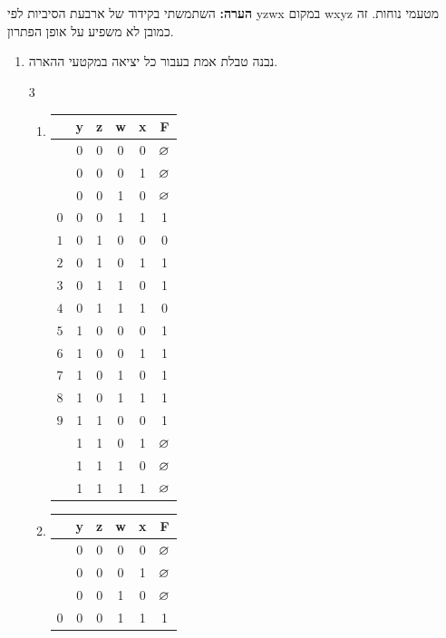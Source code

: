 \documentclass[]{../../../../tex/classes/homework}
\newcommand\DC{$\vn$}
\begin{document}
	\section{}
	\textbf{הערה: }השתמשתי בקידוד של ארבעת הסיביות לפי {yzwx} במקום {wxyz} מטעמי נוחות. זה כמובן לא משפיע על אופן הפתרון. 
	\begin{enumerate}
		\item נבנה טבלת אמת בעבור כל יציאה במקטעי ההארה. 
		\begin{multicols}{3}
			\begin{enumerate}
				\item \begin{center}
					\begin{tabular}{ c c c c c|c }
						\en{No.} & y & z & w & x & F \\
						\hline
						   & 0 & 0 & 0 & 0 & \DC \\ 
						   & 0 & 0 & 0 & 1 & \DC \\ 
						   & 0 & 0 & 1 & 0 & \DC \\ 
						$0$& 0 & 0 & 1 & 1 & 1 \\ 
						$1$& 0 & 1 & 0 & 0 & 0 \\ 
						$2$& 0 & 1 & 0 & 1 & 1 \\ 
						$3$& 0 & 1 & 1 & 0 & 1 \\ 
						$4$& 0 & 1 & 1 & 1 & 0 \\ 
						$5$& 1 & 0 & 0 & 0 & 1 \\ 
						$6$& 1 & 0 & 0 & 1 & 1 \\ 
						$7$& 1 & 0 & 1 & 0 & 1 \\ 
						$8$& 1 & 0 & 1 & 1 & 1 \\
						$9$& 1 & 1 & 0 & 0 & 1 \\ 
						   & 1 & 1 & 0 & 1 & \DC \\ 
						   & 1 & 1 & 1 & 0 & \DC \\ 
						   & 1 & 1 & 1 & 1 & \DC
					\end{tabular}
				\end{center}
				\item \begin{center}
					\begin{tabular}{ c c c c c|c }
						\en{No.} & y & z & w & x & F \\
						\hline
						   & 0 & 0 & 0 & 0 & \DC \\ 
						   & 0 & 0 & 0 & 1 & \DC \\ 
						   & 0 & 0 & 1 & 0 & \DC \\ 
						$0$& 0 & 0 & 1 & 1 & 1 \\ 

\end{tabular}
\end{center}
\end{enumerate}
\end{multicols}
\end{enumerate}
\end{document}
